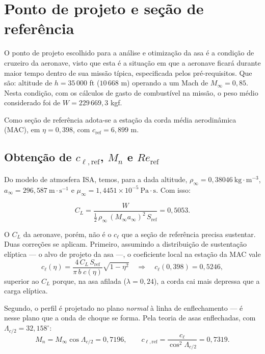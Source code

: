 \newpage
\section{Ponto de projeto e seção de referência}

O ponto de projeto escolhido para a análise e otimização da asa é a condição
de cruzeiro da aeronave, visto que esta é a situação em que a aeronave ficará
durante maior tempo dentro de sua missão típica, especificada pelos
pré-requisitos. Que são: altitude de $h = 35\,000$ ft ($10\,668$ m) operando a
um Mach de $M_\infty = 0{,}85$. Nesta condição, com os cálculos de gasto de
combustível na missão, o peso médio considerado foi de $W = 229\,669{,}3$ kgf.

Como seção de referência adota-se a estação da corda média aerodinâmica
(MAC), em $\eta = 0{,}398$, com $c_{\mathrm{ref}} = 6{,}899$ m.

\subsection*{Obtenção de $c_{\ell,\mathrm{ref}}$, $M_n$ e $Re_{\mathrm{ref}}$}

Do modelo de atmosfera ISA, temos, para a dada altitude,
$\rho_\infty = 0{,}38046 \ \mathrm{kg \cdot m^{-3}}$,
$a_\infty = 296{,}587 \ \mathrm{m \cdot s^{-1}}$ e
$\mu_\infty = 1{,}4451 \times 10^{-5} \ \mathrm{Pa \cdot s}$. Com isso:

\begin{equation*}
    C_L = \frac{W}{\tfrac{1}{2}\,\rho_\infty\,(M_\infty a_\infty)^2\,S_{\mathrm{ref}}}
        = 0{,}5053.
\end{equation*}

O $C_L$ da aeronave, porém, não é o $c_\ell$ que a seção de referência
precisa sustentar. Duas correções se aplicam. Primeiro, assumindo a
distribuição de sustentação elíptica --- o alvo de projeto da asa ---, o
coeficiente local na estação da MAC vale
\begin{equation*}
    c_\ell(\eta) = \frac{4\,C_L\,S_{\mathrm{ref}}}{\pi\,b\;c(\eta)}\sqrt{1-\eta^2}
    \quad\Rightarrow\quad c_\ell(0{,}398) = 0{,}5246,
\end{equation*}
superior ao $C_L$ porque, na asa afilada ($\lambda = 0{,}24$), a corda cai
mais depressa que a carga elíptica.

Segundo, o perfil é projetado no plano \emph{normal} à linha de enflechamento
--- é nesse plano que a onda de choque se forma. Pela teoria de asas
enflechadas, com $\Lambda_{c/2} = 32{,}158^\circ$:
\begin{equation*}
    M_n = M_\infty \cos\Lambda_{c/2} = 0{,}7196,
    \qquad
    c_{\ell,\mathrm{ref}} = \frac{c_\ell}{\cos^2\Lambda_{c/2}} = 0{,}7319.
\end{equation*}

